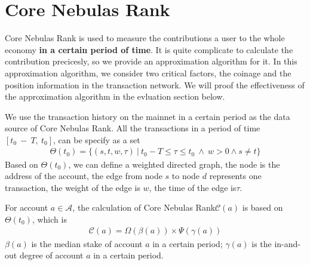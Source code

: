 \section{Core Nebulas Rank}

Core Nebulas Rank is used to measure the contributions a user to the whole economy {\textbf{in a certain period of time}}.
It is quite complicate to calculate the contribution precicesly, so we provide an approximation algorithm for it.
In this approximation algorithm, we consider two critical factors, the coinage and the position information in the transaction network. We will proof the effectiveness of the approximation algorithm in the evluation section below.

We use the transaction history on the mainnet in a certain period as the data source of Core Nebulas Rank.
All the transactions in a period of time $[t_0\ −\ T,\ t_0]$, can be specify as a set
\begin{align}
\Theta(t_0) = \{(s, t, w, \tau)\ |\ t_0 - T \le \tau \le t_0\ \land \ w > 0 \land s \neq t \}
\end{align}
\noindent Based on $\Theta(t_0)$, we can define a weighted directed graph, the node is the address of the account, the edge from node $s$ to node $d$ represents one transaction,
the weight of the edge is $w$, the time of the edge is$\tau$.

For account $a \in \mathcal{A}$, the calculation of Core Nebulas Rank$\mathcal{C}(a)$ is based on $\Theta(t_0)$, which is
\begin{align}
\mathcal{C}(a) = \Omega(\beta(a)) \times{} \Psi(\gamma(a))
\label{eq:rank}
\end{align}
\noindent $\beta(a)$ is the median stake of account $a$ in a certain period; $\gamma(a)$ is the in-and-out degree of account $a$ in a certain period.


